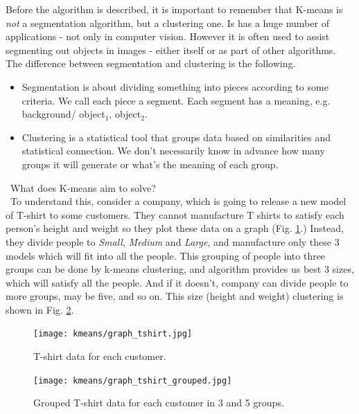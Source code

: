 \documentclass[a4paper]{article}
\begin{document}
Before the algorithm is described, it is important to remember that K-means is \textit{not} a segmentation algorithm, but a clustering one. Is has a huge number of applications - not only in computer vision. However it is often used to assist segmenting out objects in images - either itself or as part of other algorithms. The difference between segmentation and clustering is the following.
\begin{itemize}
    \item Segmentation is about dividing something into pieces according to some criteria. We call each piece a segment. Each segment has a meaning, e.g. background/ object$_1$, object$_2$.
    \item Clustering is a statistical tool that groups data based on similarities and statistical connection. We don't necessarily know in advance how many groups it will generate or what's the meaning of each group.
\end{itemize}

\faQuestionCircle \ What does K-means aim to solve? \\
\faCheckCircle \ To understand this, consider a company, which is going to release a new model of T-shirt to some customers. They cannot manufacture T shirts to satisfy each person's height and weight so they plot these data on a graph (Fig. \ref{fig:kmeans_tshirt}.) Instead, they divide people to \textit{Small}, \textit{Medium} and \textit{Large}, and manufacture only these 3 models which will fit into all the people. This grouping of people into three groups can be done by k-means clustering, and algorithm provides us best 3 sizes, which will satisfy all the people. And if it doesn't, company can divide people to more groups, may be five, and so on. This size (height and weight) clustering is shown in Fig. \ref{fig:kmeans_tshirt_labelled}.

\begin{multicols}{2}
\begin{figure}[H]
	\centering %
    	\texttt{[image: kmeans/graph\_tshirt.jpg]}
    \caption{T-shirt data for each customer.}
    \label{fig:kmeans_tshirt}
\end{figure}
\columnbreak
\begin{figure}[H]
	\centering %
    	\texttt{[image: kmeans/graph\_tshirt\_grouped.jpg]}
    \caption{Grouped T-shirt data for each customer in 3 and 5 groups.}
    \label{fig:kmeans_tshirt_labelled}
\end{figure}
\end{multicols}
\end{document}
